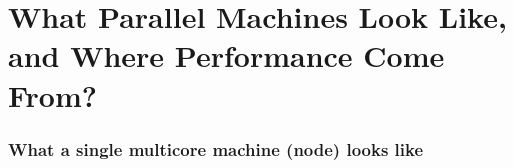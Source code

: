 \documentclass[12pt,dvipdfmx]{beamer}
\begin{document}
\section{What Parallel Machines Look Like, and Where Performance Come From?}

\begin{frame}
\frametitle{What a single multicore machine (node) looks like}
\begin{columns}
\begin{column}{0.4\textwidth}
\begin{center}
%
%

\end{center}
\end{column}
\end{columns}
\end{frame}
\end{document}
